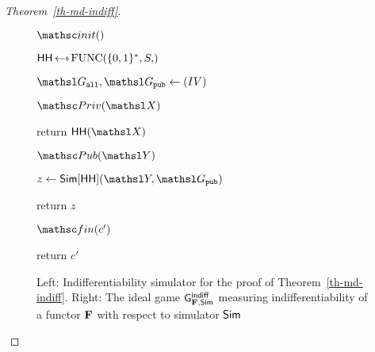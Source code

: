\begin{proof}[Theorem~\ref{th-md-indiff}]
\begin{figure}
		
{

		\begin{algorithm}{$\Initialize()$}
			\item $\HH \getsr \AllFuncs{\bits^*, \S}$
			\item $\graph_{\all}, \graph_{\public} \gets (\IV)$
		\end{algorithm}
		\ExptSepSpace
		\begin{algorithm}{$\PrivO(\XEDSA)$}
			\item return $\HH(\XEDSA)$
		\end{algorithm}	
			\ExptSepSpace
		\begin{algorithm}{$\PubO(\YEDSA)$}
			\item $z \gets \simulator[\HH](\YEDSA, \graph_{\public})$
			\item return $z$
		\end{algorithm}
		\ExptSepSpace
		\begin{algorithm}{$\Finalize(c')$}
			\item return $c'$
		\end{algorithm}
	}
	\vspace{5pt}
	\caption{Left: Indifferentiability simulator for the proof of Theorem~\ref{th-md-indiff}. Right: The ideal game  $\mathsf{G}^{\mathsf{indiff}}_{\mathbf{F}, \mathsf{Sim}}$ measuring indifferentiability of a functor $\mathbf{F}$ with respect to simulator $\mathsf{Sim}$}
	\label{fig-chop-gm0}
	\label{fig-chop-sim}
\end{figure}


\end{proof}
